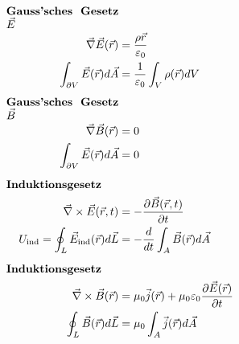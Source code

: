 \begin{align*}
    \parbox{3.5cm}{\textbf{Gauss'sches Gesetz $\vec{E}$}}\\
    \vec{\nabla}\vec{E}(\vec{r}) &= \frac{\rho{\vec{r}}}{\varepsilon_0}\\
    \int_{\partial V} \vec{E}(\vec{r}) d \vec{A} &= \frac{1}{\varepsilon_0} \int_V \rho(\vec{r}) dV
    \\[0.5em]
    \parbox{3.5cm}{\textbf{Gauss'sches Gesetz $\vec{B}$}}\\
    \vec{\nabla}\vec{B}(\vec{r}) &= 0\\
    \int_{\partial V} \vec{E}(\vec{r}) d \vec{A} &= 0
    \\[0.5em]
    \parbox{3.5cm}{\textbf{Induktionsgesetz}}\\
    \vec{\nabla} \times \vec{E}(\vec{r},t) &= - \frac{\partial \vec{B}(\vec{r},t)}{\partial t}\\
    U_\text{ind} = \oint_L \vec{E}_\text{ind}(\vec{r}) d \vec{L} &= - \frac{d}{dt} \int_A \vec{B}(\vec{r}) d \vec{A}
    \\[0.5em]
    \parbox{3.5cm}{\textbf{Induktionsgesetz}}\\
    \vec{\nabla} \times \vec{B}(\vec{r}) &= \mu_0 \vec{j}(\vec{r}) + \mu_0 \varepsilon_0 \frac{\partial \vec{E}(\vec{r})}{\partial t}\\
    \oint_L \vec{B}(\vec{r}) d \vec{L} &= \mu_0 \int_A \vec{j}(\vec{r}) d \vec{A}
\end{align*}